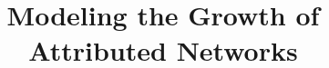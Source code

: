 \documentclass[sigconf]{acmart}
\begin{document}
\title{Modeling the Growth of Attributed Networks}


\renewcommand{\shortauthors}{Anonymous et al.}
\begin{abstract}

\end{abstract}

%
%
%
%


\maketitle





% 
\clearpage


% 
\end{document}
